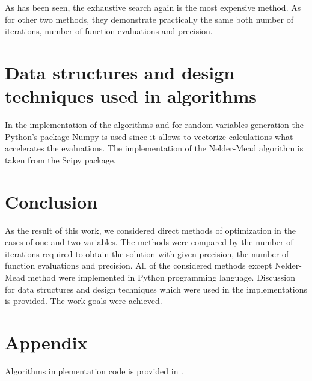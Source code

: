 \documentclass[12pt, bachelor, substylefile = algo_title.rtx]{disser}
\theoremstyle{definition}
\begin{document}
As has been seen, the exhaustive search again is the most expensive method. As for other two methods, they demonstrate practically the same both number of iterations, number of function evaluations and precision. 


\section{Data structures and design techniques used in algorithms}

In the implementation of the algorithms and for random variables generation the Python's package Numpy is used since it allows to vectorize calculations what accelerates the evaluations. The implementation of the Nelder-Mead algorithm is taken from the Scipy package.


\section{Conclusion}
As the result of this work, we considered direct methods of optimization in the cases of one and two variables. The methods were compared by the number of iterations required to obtain the solution with given precision, the number of function evaluations and precision. All of the considered methods except Nelder-Mead method were implemented in Python programming language.
Discussion for data structures and design techniques which were used in the implementations is provided. The work goals were achieved.

\section{Appendix}
Algorithms implementation code is provided in \cite{repogithub}.

{\small }

\end{document}
